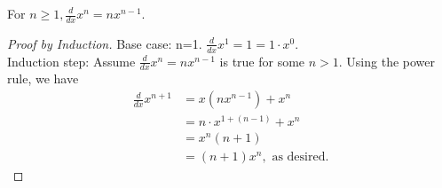    \begin{theorem}
        For $n\geq 1, \frac{d}{dx}x^n = nx^{n-1}$.
        \begin{proof} [Proof by Induction]
            Base case: n=1. $\frac{d}{dx}x^1=1=1\cdot x^0$. \\
            Induction step: Assume $\frac{d}{dx}x^n = nx^{n-1}$ is true for some $n>1$. 
            Using the power rule, we have
            \begin{align*}
                \frac{d}{dx}x^{n+1} &= x(nx^{n-1})+x^n \\
                &= n\cdot x^{1+(n-1)}+x^n \\
                &= x^n(n+1) \\
                &= (n+1)x^n, \text{ as desired.}
            \end{align*}
        \end{proof}
    \end{theorem}

